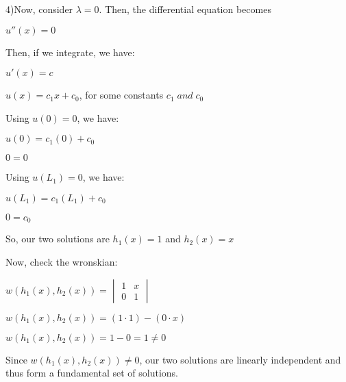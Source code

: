 \documentclass[12pt, executivepaper]{article}
\begin{document}
\begin{flushleft}

4)Now, consider $\lambda=0$. Then, the differential equation becomes

\begin{center}

$u''(x)=0$

\end{center}

Then, if we integrate, we have: 

\begin{center}

$u'(x)=c$

$u(x)=c_{1}x+c_{0}$, for some constants $c_{1} \; and \; c_{0}$

\end{center}

Using $u(0)=0$, we have:

\begin{center}

$u(0)=c_{1}(0)+c_{0}$

$0=0$

\end{center}

Using $u(L_{1})=0$, we have: 

\begin{center}

$u(L_{1})=c_{1}(L_{1})+c_{0}$

$0=c_{0}$

\end{center}

So, our two solutions are $h_{1}(x)=1$ and $h_{2}(x)=x$

\vspace{3mm}

Now, check the wronskian:

\begin{center}

$w(h_{1}(x), h_{2}(x))=\begin{vmatrix}
1 & x \\ 
0 & 1 
\end{vmatrix}$

$w(h_{1}(x), h_{2}(x))=(1 \cdot 1)-(0 \cdot x)$

$w(h_{1}(x), h_{2}(x))=1-0=1 \neq 0$

\end{center}

Since $w(h_{1}(x), h_{2}(x)) \neq 0$, our two solutions are linearly independent and thus form a fundamental set of solutions.


\end{flushleft}
\end{document}
